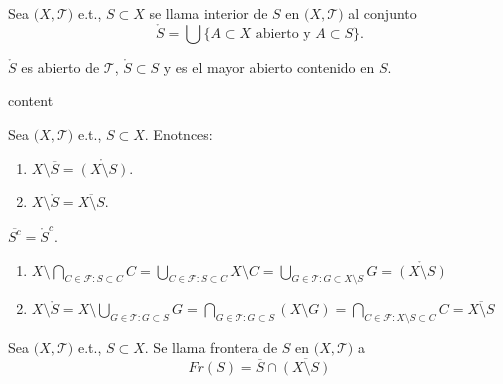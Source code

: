 \begin{defn}[Interior]
  Sea $\big( X, \mathcal{T} \big)$ e.t., $S \subset X$ se llama interior de $ S$ en $\big( X, \mathcal{T} \big)$ al conjunto 
  \[  
  \mathring{S} = \bigcup \{ A \subset X \text{ abierto y } A \subset S \}. 
  \] 
\end{defn}

\begin{obs}
  $\mathring{S}$ es abierto de $\mathcal{T}$, $\mathring{S} \subset S$ y es el mayor abierto contenido en $S$.
\end{obs}

\begin{prop}
  content
\end{prop}

\begin{prop}
  Sea $\big( X, \mathcal{T} \big)$ e.t., $ S \subset X$. Enotnces:
  \begin{enumerate}[label=(\roman*)]
    \item $X \setminus \overline{S} = \mathring{(X \setminus S)}$.
    \item $X \setminus \mathring{S} = \overline{X \setminus S}$.
  \end{enumerate}
\end{prop}

\begin{obs}
  $\overline{S^{c}} = \mathring{S}^{c}$.
\end{obs}

\begin{dem}
  \begin{enumerate}[label=(\roman*)]
    \item $X \setminus \bigcap_{C \in \mathcal{F}: S \subset C} C = \bigcup_{C \in \mathcal{F}: S \subset C} X \setminus C = \bigcup_{G \in \mathcal{T}: G \subset X \setminus S} G = \mathring{(X \setminus S)}$
    \item $X \setminus \mathring{S} = X \setminus \bigcup_{G \in \mathcal{T}: G \subset S} G = \bigcap_{G \in \mathcal{T}: G \subset S} (X \setminus G) = \bigcap_{C \in \mathcal{F}: X \setminus S \subset C} C = \overline{X \setminus S}$
  \end{enumerate}
\end{dem}

\begin{defn}[Frontera]
  Sea $\big( X, \mathcal{T} \big)$ e.t., $ S \subset X$. Se llama frontera de $ S$ en $ \big( X, \mathcal{T} \big)$ a \[ Fr(S) = \overline{S} \cap \overline{(X \setminus S)}\]
\end{defn}


